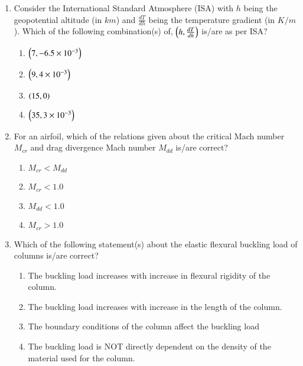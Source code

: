 \documentclass[journal,12pt,onecolumn]{IEEEtran}
\theoremstyle{remark}
\begin{document}
\begin{enumerate}[start=40]
	\item Consider the International Standard Atmosphere (ISA) with $h$ being the geopotential altitude (in $km$) and $\frac{dT}{dh}$ being the temperature gradient (in $K/m$). Which of the following combination(s) of, $\left(h,\frac{dT}{dh}\right)$ is/are as per ISA?
		\begin{enumerate}
			\item $\left(7,-6.5\times10^{-3}\right)$
			\item $\left(9,4\times10^{-3}\right)$
			\item $\left(15,0\right)$
			\item $\left(35,3\times10^{-3}\right)$
		\end{enumerate}

		
	\item For an airfoil, which of the relations given about the critical Mach number $M_{cr}$ and drag divergence Mach number $M_{dd}$ is/are correct?
		\begin{enumerate}
			\item $M_{cr}<M_{dd}$
			\item $M_{cr}<1.0$
			\item $M_{dd}<1.0$
			\item $M_{cr}>1.0$
		\end{enumerate}

	\item Which of the following statement(s) about the elastic flexural buckling load of columns is/are correct?
		\begin{enumerate}
			\item The buckling load increases with increase in flexural rigidity of the column.
			\item The buckling load increases with increase in the length of the column.
			\item The boundary conditions of the column affect the buckling load
			\item The buckling load is NOT directly dependent on the density of the material used for the column.
		\end{enumerate}



\end{enumerate}
\end{document}
